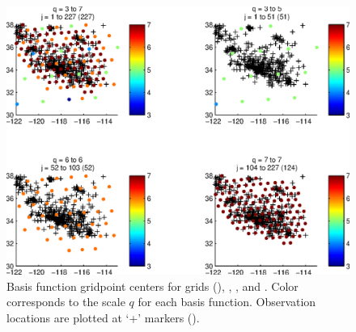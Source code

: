 \documentclass[11pt,titlepage,fleqn]{article}
\begin{document}
\begin{figure}
\includegraphics[width=16cm]{fig2D_A7.eps}
\caption[]
{{
Basis function gridpoint centers for grids  (), , , and .
Color corresponds to the scale $q$ for each basis function.
Observation locations are plotted at `+' markers ().
\label{fig:2D_A7}
}}
\end{figure}
\end{document}
